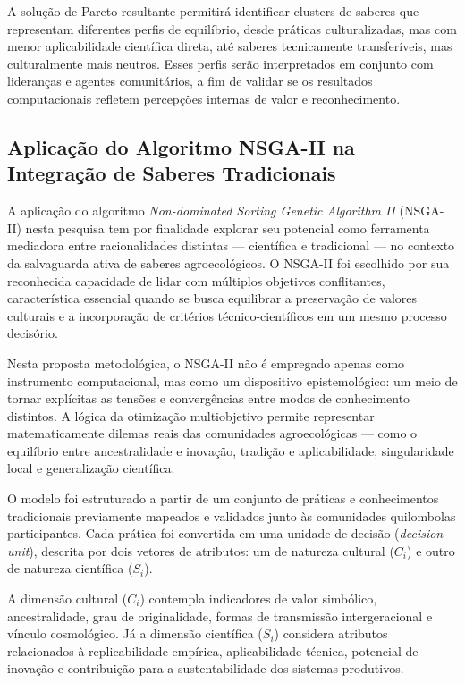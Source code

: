A solução de Pareto resultante permitirá identificar clusters de saberes que representam diferentes perfis de equilíbrio, desde práticas culturalizadas, mas com menor aplicabilidade científica direta, até saberes tecnicamente transferíveis, mas culturalmente mais neutros. Esses perfis serão interpretados em conjunto com lideranças e agentes comunitários, a fim de validar se os resultados computacionais refletem percepções internas de valor e reconhecimento.


\subsection{Aplicação do Algoritmo NSGA-II na Integração de Saberes Tradicionais}

A aplicação do algoritmo \textit{Non-dominated Sorting Genetic Algorithm II} (NSGA-II) nesta pesquisa tem por finalidade explorar seu potencial como ferramenta mediadora entre racionalidades distintas — científica e tradicional — no contexto da salvaguarda ativa de saberes agroecológicos. O NSGA-II foi escolhido por sua reconhecida capacidade de lidar com múltiplos objetivos conflitantes, característica essencial quando se busca equilibrar a preservação de valores culturais e a incorporação de critérios técnico-científicos em um mesmo processo decisório.

Nesta proposta metodológica, o NSGA-II não é empregado apenas como instrumento computacional, mas como um dispositivo epistemológico: um meio de tornar explícitas as tensões e convergências entre modos de conhecimento distintos. A lógica da otimização multiobjetivo permite representar matematicamente dilemas reais das comunidades agroecológicas — como o equilíbrio entre ancestralidade e inovação, tradição e aplicabilidade, singularidade local e generalização científica.

O modelo foi estruturado a partir de um conjunto de práticas e conhecimentos tradicionais previamente mapeados e validados junto às comunidades quilombolas participantes. Cada prática foi convertida em uma unidade de decisão (\textit{decision unit}), descrita por dois vetores de atributos: um de natureza cultural ($C_i$) e outro de natureza científica ($S_i$). 

A dimensão cultural ($C_i$) contempla indicadores de valor simbólico, ancestralidade, grau de originalidade, formas de transmissão intergeracional e vínculo cosmológico. Já a dimensão científica ($S_i$) considera atributos relacionados à replicabilidade empírica, aplicabilidade técnica, potencial de inovação e contribuição para a sustentabilidade dos sistemas produtivos. 

